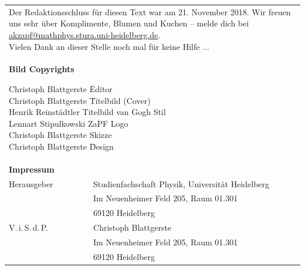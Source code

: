 \documentclass{scrbook}
\begin{document}
\null
\newpage
{}
\vspace*{\fill}
    \begin{tabular*}{\textwidth}{ll}
        \multicolumn{2}{l}{
            \parbox{\textwidth}{
                Der Redaktionsschluss für diesen Text war am 21. November 2018. Wir freuen uns
                sehr über Komplimente, Blumen und Kuchen -- melde dich bei
                \href{mailto:akzapf@mathphys.stura.uni-heidelberg.de}{akzapf@mathphys.stura.uni-heidelberg.de}. \\
                Vielen Dank an dieser Stelle noch mal für keine Hilfe ...
            }
            \vspace{1cm}
        }\\
	\multicolumn{2}{l}{
	\parbox{0.77\textwidth}{
       	\textbf{Bild Copyrights}
       	\begin{tabbing}
        Christoph Blattgerste \quad \quad \= Editor \\
		Christoph Blattgerste \quad \quad \=  Titelbild (Cover) \\
		Henrik Reinstädtler\> Titelbild van Gogh Stil \\
		Lennart Stipulkowski \> ZaPF Logo \\
		Christoph Blattgerste\footnotemark \> Skizze \\
        Christoph Blattgerste \quad \quad \= Design
		\end{tabbing}
       	}
      }\\

        \textbf{Impressum} \\
        Herausgeber & Studienfachschaft Physik, Universität Heidelberg \\
        & Im Neuenheimer Feld 205, Raum 01.301\\
        & 69120 Heidelberg\\
        V.\,i.\,S.\,d.\,P. & Christoph Blattgerste\\
        & Im Neuenheimer Feld 205, Raum 01.301\\
        & 69120 Heidelberg\\
    \end{tabular*}

    \vfill


\null
\newpage
\end{document}
